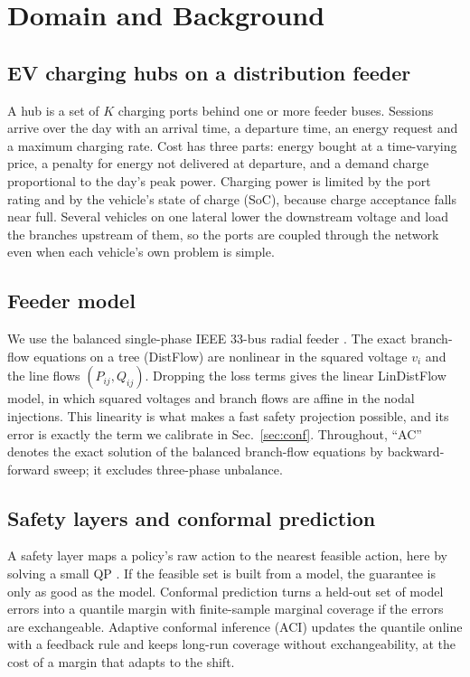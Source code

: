 \documentclass[11pt]{article}
\begin{document}
\section{Domain and Background}
\subsection{EV charging hubs on a distribution feeder}
A hub is a set of $K$ charging ports behind one or more feeder buses. Sessions arrive over the day with an arrival time, a departure time, an energy request and a maximum charging rate. Cost has three parts: energy bought at a time-varying price, a penalty for energy not delivered at departure, and a demand charge proportional to the day's peak power. Charging power is limited by the port rating and by the vehicle's state of charge (SoC), because charge acceptance falls near full. Several vehicles on one lateral lower the downstream voltage and load the branches upstream of them, so the ports are coupled through the network even when each vehicle's own problem is simple.

\subsection{Feeder model}
We use the balanced single-phase IEEE 33-bus radial feeder \cite{baranwu}. The exact branch-flow equations on a tree (DistFlow) \cite{farivar} are nonlinear in the squared voltage $v_i$ and the line flows $(P_{ij},Q_{ij})$. Dropping the loss terms gives the linear LinDistFlow model, in which squared voltages and branch flows are affine in the nodal injections. This linearity is what makes a fast safety projection possible, and its error is exactly the term we calibrate in Sec.~\ref{sec:conf}. Throughout, ``AC'' denotes the exact solution of the balanced branch-flow equations by backward-forward sweep; it excludes three-phase unbalance.

\subsection{Safety layers and conformal prediction}
A safety layer maps a policy's raw action to the nearest feasible action, here by solving a small QP \cite{optnet,cvxpylayers,dalal}. If the feasible set is built from a model, the guarantee is only as good as the model. Conformal prediction \cite{vovk,lei,angelopoulos} turns a held-out set of model errors into a quantile margin with finite-sample marginal coverage if the errors are exchangeable. Adaptive conformal inference (ACI) \cite{aci} updates the quantile online with a feedback rule and keeps long-run coverage without exchangeability, at the cost of a margin that adapts to the shift.
\end{document}
